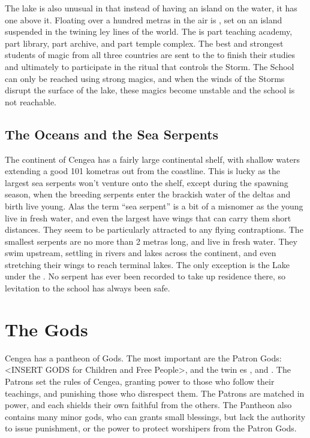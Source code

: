 \documentclass[blue]{GL2020}
\begin{document}
The lake is also unusual in that instead of having an island on the water, it has one above it. Floating over a hundred metras in the air is \pSchool{}, set on an island suspended in the twining ley lines of the world. The \pSchool{} is part teaching academy, part library, part archive, and part temple complex. The best and strongest students of magic from all three countries are sent to the \pSchool{} to finish their studies and ultimately to participate in the ritual that controls the Storm.  The School can only be reached using strong magics, and when the winds of the Storms disrupt the surface of the lake, these magics become unstable and the school is not  reachable.



\subsection*{The Oceans and the Sea Serpents}
The continent of Cengea has a fairly large continental shelf, with shallow waters extending a good 101 kometras out from the coastline. This is lucky as the largest sea serpents won't venture onto the shelf, except during the spawning season, when the breeding serpents enter the brackish water of the deltas and birth live young. Alas the term ``sea serpent'' is a bit of a misnomer as the young live in fresh water, and even the largest have wings that can carry them short distances. They seem to be particularly attracted to any flying contraptions.  The smallest serpents are no more than 2 metras long, and live in fresh water. They swim upstream, settling in rivers and lakes across the continent, and even stretching their wings to reach terminal lakes. The only exception is the Lake under the \pSchool{}. No serpent has ever been recorded to take up residence there, so levitation to the school has always been safe.


\section*{The Gods}
Cengea has a pantheon of Gods. The most important are the Patron Gods: <INSERT GODS for Children and Free People>, and the twin \cEbb{\God}es \cEbbFull{}, and \cFlowFull{}. The Patrons set the rules of Cengea, granting power to those who follow their teachings, and punishing those who disrespect them. The Patrons are matched in power, and each shields their own faithful from the others. The Pantheon also contains many minor gods, who can grants small blessings, but lack the authority to issue punishment, or the power to protect worshipers from the Patron Gods.
\end{document}
